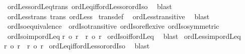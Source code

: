\begin{isabellebody}
%
\isadelimproof
%
\endisadelimproof
%
\isatagproof
{}\isamarkupfalse%
\ ordLess{\isacharunderscore}{\kern0pt}ordLeq{\isacharunderscore}{\kern0pt}trans\ ordLeq{\isacharunderscore}{\kern0pt}iff{\isacharunderscore}{\kern0pt}ordLess{\isacharunderscore}{\kern0pt}or{\isacharunderscore}{\kern0pt}ordIso\ \isamarkupfalse%
\ blast%
\endisatagproof
{\isafoldproof}%
%
\isadelimproof
\isanewline
%
\endisadelimproof
\isanewline
{}\isamarkupfalse%
\ ordLess{\isacharunderscore}{\kern0pt}trans{\isacharcolon}{\kern0pt}\ {\isachardoublequoteopen}trans\ ordLess{\isachardoublequoteclose}\isanewline
%
\isadelimproof
%
\endisadelimproof
%
\isatagproof
{}\isamarkupfalse%
\ trans{\isacharunderscore}{\kern0pt}def\ \isamarkupfalse%
\ ordLess{\isacharunderscore}{\kern0pt}transitive\ \isamarkupfalse%
\ blast%
\endisatagproof
{\isafoldproof}%
%
\isadelimproof
\isanewline
%
\endisadelimproof
\isanewline
{}\isamarkupfalse%
\ ordIso{\isacharunderscore}{\kern0pt}equivalence\ {\isacharequal}{\kern0pt}\ ordIso{\isacharunderscore}{\kern0pt}transitive\ ordIso{\isacharunderscore}{\kern0pt}reflexive\ ordIso{\isacharunderscore}{\kern0pt}symmetric\isanewline
\isanewline
{}\isamarkupfalse%
\ ordIso{\isacharunderscore}{\kern0pt}imp{\isacharunderscore}{\kern0pt}ordLeq{\isacharcolon}{\kern0pt}\isanewline
{\isachardoublequoteopen}r\ {\isacharequal}{\kern0pt}o\ r{\isacharprime}{\kern0pt}\ {\isasymLongrightarrow}\ r\ {\isasymle}o\ r{\isacharprime}{\kern0pt}{\isachardoublequoteclose}\isanewline
%
\isadelimproof
%
\endisadelimproof
%
\isatagproof
{}\isamarkupfalse%
\ ordIso{\isacharunderscore}{\kern0pt}iff{\isacharunderscore}{\kern0pt}ordLeq\ \isamarkupfalse%
\ blast%
\endisatagproof
{\isafoldproof}%
%
\isadelimproof
\isanewline
%
\endisadelimproof
\isanewline
{}\isamarkupfalse%
\ ordLess{\isacharunderscore}{\kern0pt}imp{\isacharunderscore}{\kern0pt}ordLeq{\isacharcolon}{\kern0pt}\isanewline
{\isachardoublequoteopen}r\ {\isacharless}{\kern0pt}o\ r{\isacharprime}{\kern0pt}\ {\isasymLongrightarrow}\ r\ {\isasymle}o\ r{\isacharprime}{\kern0pt}{\isachardoublequoteclose}\isanewline
%
\isadelimproof
%
\endisadelimproof
%
\isatagproof
{}\isamarkupfalse%
\ ordLeq{\isacharunderscore}{\kern0pt}iff{\isacharunderscore}{\kern0pt}ordLess{\isacharunderscore}{\kern0pt}or{\isacharunderscore}{\kern0pt}ordIso\ \isamarkupfalse%
\ blast%
\endisatagproof
{\isafoldproof}%
%
\isadelimproof
\isanewline
%
\endisadelimproof

\end{isabellebody}
